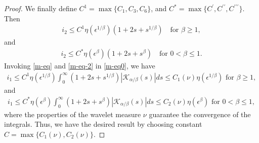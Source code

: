 \documentclass[10pt,a4paper]{amsart}
\begin{document}
\begin{proof}
\noindent We finally define 
 $C^1= \max\{C_1, C_3, C_6 \}$, and $C^*=\max \{C^\prime, C^{\prime\prime},C^{\prime\prime\prime} \}$. Then
\begin{align} \label{m-eq}
    i_2 \leq C^1\eta(\epsilon^{1/\beta})\left( 1+2s+s^{1/\beta} \right) \quad \text{for } \beta\geq 1,
\end{align} and 
\begin{align} \label{m-eq-2}
    i_2 \leq C^*\eta(\epsilon^{\beta})\left( 1+2s+s^{\beta} \right) \quad \text{for }0< \beta\leq 1.
\end{align}
 Invoking \eqref{m-eq} and \eqref{m-eq-2} in \eqref{m-eq0},  we have
\begin{align*}
     i_1  \leq C^1\eta(\epsilon^{1/\beta}) \int_0^\infty  \left( 1+2s+s^{1/\beta} \right)\left|\mathcal{K}_{\alpha/\beta}(s)\right|ds \leq C_1(\nu)\eta(\epsilon^{1/\beta}) \text{  for } \beta\geq 1,
\end{align*} 
and 
\begin{align*}
     i_1 \leq C^*\eta(\epsilon^{\beta}) \int_0^\infty  \left( 1+2s+s^{\beta} \right)\left|\mathcal{K}_{\alpha/\beta}(s)\right|ds \leq C_2(\nu)\eta(\epsilon^{\beta}) \text{ 
 for } 0<\beta\leq 1,
\end{align*}
where the properties of the wavelet measure $\nu$ guarantee the convergence of the integrals. Thus, we have the desired result by choosing constant \( C =\max\{C_1(\nu),C_2(\nu)\}\).
\end{proof}
\end{document}
